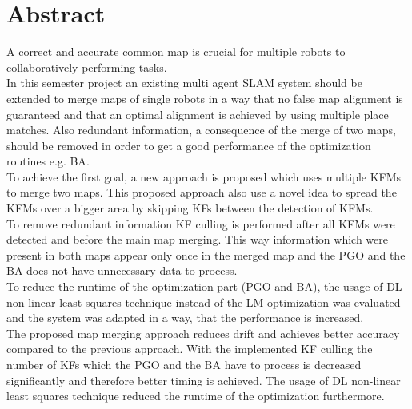 \chapter*{Abstract}

A correct and accurate common map is crucial for multiple robots to collaboratively performing tasks.\\

In this semester project an existing multi agent \ac{SLAM} system should be extended to merge maps of single robots in a way that no false map alignment is guaranteed and that an optimal alignment is achieved by using multiple place matches. Also redundant information, a consequence of the merge of two maps, should be removed in order to get a good performance of the optimization routines e.g. \ac{BA}.\\

To achieve the first goal, a new approach is proposed which uses multiple \acfp{KFM} to merge two maps. This proposed approach also use a novel idea to spread the \acp{KFM} over a bigger area by skipping \acfp{KF} between the detection of \acp{KFM}.\\
To remove redundant information \ac{KF} culling is performed after all \acp{KFM} were detected and before the main map merging. This way information which were present in both maps appear only once in the merged map and the \ac{PGO} and the \ac{BA} does not have unnecessary data to process.\\
To reduce the runtime of the optimization part (\ac{PGO} and \ac{BA}), the usage of \acf{DL} non-linear least squares technique instead of the \acf{LM} optimization was evaluated and the system was adapted in a way, that the performance is increased.\\

The proposed map merging approach reduces drift and achieves better accuracy compared to the previous approach. With the implemented \ac{KF} culling the number of \acp{KF} which the \ac{PGO} and the \ac{BA} have to process is decreased significantly and therefore better timing is achieved. The usage of \ac{DL} non-linear least squares technique reduced the runtime of the optimization furthermore.

